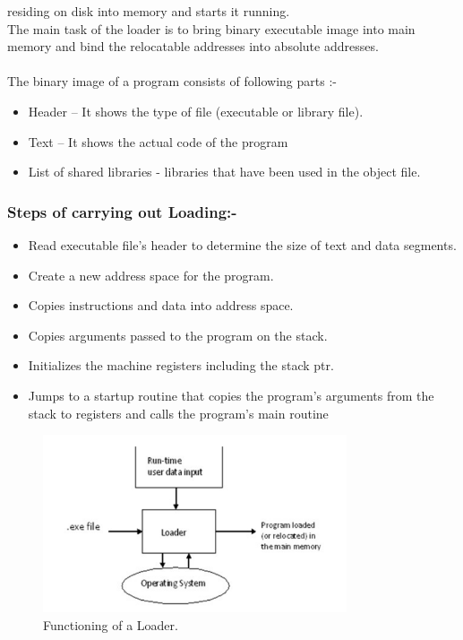 \documentclass[12pt]{article}
\begin{document}
residing on disk into memory and starts it running.\\
The main task of the loader is to bring binary executable image into main
memory and bind the relocatable addresses into absolute addresses.\\\\
The binary image of a program consists of following parts :-
\begin{itemize}
  \item Header – It shows the type of file (executable or library file).
  \item Text – It shows the actual code of the program \item List of shared libraries - libraries that have been used in the object
file.
\end{itemize}
\subsubsection{Steps of carrying out Loading:-}
\begin{itemize}
  \item Read executable file’s header to determine the size of 
text and data segments.
  \item Create a new address space for the program.\item Copies instructions and data into address space. \item Copies arguments passed to the program on the stack.\item Initializes the machine registers including the stack ptr. \item Jumps to a startup routine that copies the program’s 
arguments from the stack to registers and calls the 
program’s main routine
\end{itemize}
\begin{figure}[H]
\centering
\includegraphics[width=0.8\textwidth]{loader.png}
\caption{\label{fig:loader} Functioning of a Loader.}
\end{figure}
\end{document}
